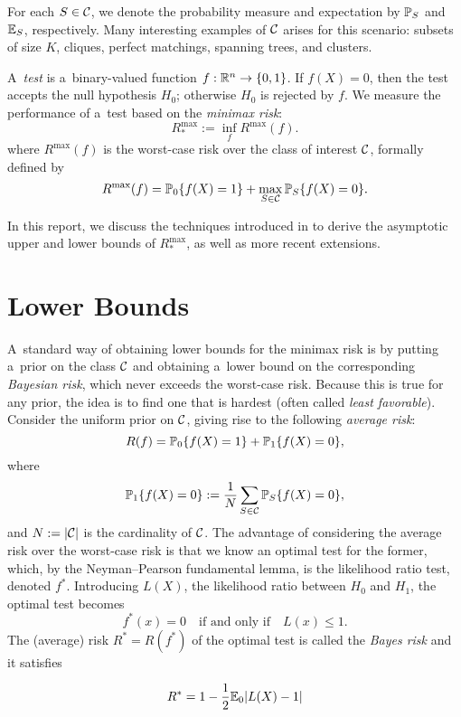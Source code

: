 \documentclass[10pt, oneside]{article}
\begin{document}
For each $S \in {\mathcal C}$, we denote the probability measure and expectation by $\mathbb{P}_S$ and $\mathbb{E}_S$, respectively. Many interesting examples of ${\mathcal C}$ arises for this scenario: subsets of size $K$, cliques, perfect matchings, spanning trees, and clusters.

A~\textit{test} is a~binary-valued function $f:{\mathbb R}^n \to\{
0,1\}$. If
$f(X)=0$, then the test accepts the null hypothesis $H_0$;
otherwise $H_0$ is rejected by $f$.
We measure the performance of a~test based on the \textit{minimax risk}:
\[
R_*^{\max} := \inf_{f} R^{\max}(f).
\]
where $R^{\max}(f)$ is the worst-case risk over the class of interest ${\mathcal C}$, formally defined by
\[
R^{\max}(f) = \mathbb{P}_0\{f(X)=1\}
+ \max_{S\in{\mathcal C}} \mathbb{P}_S\{f(X)=0\}.
\]

In this report, we discuss the techniques introduced in \cite{arias2012correlation, addario2010combinatorial, arias2011detection} to derive the asymptotic upper and lower bounds of $R_*^{\max}$, as well as more recent extensions.
\section{Lower Bounds}
A~standard way of obtaining lower bounds for the minimax risk
is by putting a~prior on the
class ${\mathcal C}$ and obtaining a~lower bound on the corresponding \textit
{Bayesian risk}, which never exceeds the worst-case risk. Because
this is true for any prior, the idea is to find one that is hardest
(often called \textit{least favorable}). Consider the
uniform prior on ${\mathcal C}$, giving rise to the following \textit{average risk}:
%
\[
R(f) = \mathbb{P}_0\{f(X)=1\}
+ \mathbb{P}_1\{f(X)=0\},
\]
%
where
%
\[
\mathbb{P}_1\{f(X)=0\} := \frac{1}{N}\sum_{S\in{\mathcal C}} \mathbb{P}_S\{f(X)=0\},
\]
%
and $N := |{\mathcal C}|$ is the cardinality of ${\mathcal C}$.
The advantage of considering the average risk over the worst-case
risk is that we know an optimal test for the former, which, by the
Neyman--Pearson fundamental lemma, is the likelihood ratio test,
denoted $f^*$. Introducing $L(X)$, the likelihood ratio between $H_0$ and $H_1$, the optimal test becomes
%
\[
f^*(x) = 0  \quad\mbox{if and only if}\quad   L(x) \le 1.
\]
The
(average)
risk $R^*=R(f^*)$ of the optimal test is called the
\textit{Bayes risk} and it satisfies

\[
R^* = 1 - \frac{1}{2} \mathbb{E}_0 |L(X) - 1|
\]
\end{document}
